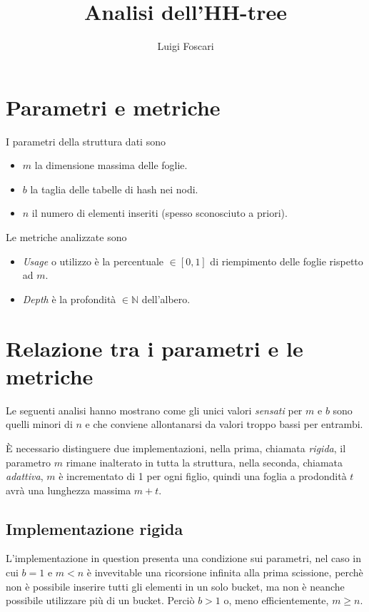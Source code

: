 \documentclass[a4paper]{article}
\title{Analisi dell'HH-tree}
\author{Luigi Foscari}
\date{}
\begin{document}
\maketitle

\section{Parametri e metriche}
I parametri della struttura dati sono
\begin{itemize}
	\item $m$ la dimensione massima delle foglie.
	\item $b$ la taglia delle tabelle di hash nei nodi.
	\item $n$ il numero di elementi inseriti (spesso sconosciuto a priori).
\end{itemize}
Le metriche analizzate sono
\begin{itemize}
	\item \textit{Usage} o utilizzo è la percentuale $\in [0, 1]$ di riempimento delle foglie rispetto ad $m$.
	\item \textit{Depth} è la profondità $\in \mathbb{N}$ dell'albero.
\end{itemize}

\section{Relazione tra i parametri e le metriche}

Le seguenti analisi hanno mostrano come gli unici valori \textit{sensati} per $m$ e $b$ sono quelli minori di $n$ e che conviene allontanarsi da valori troppo bassi per entrambi.

È necessario distinguere due implementazioni, nella prima, chiamata \textit{rigida}, il parametro $m$ rimane inalterato in tutta la struttura, nella seconda, chiamata \textit{adattiva}, $m$ è incrementato di 1 per ogni figlio, quindi una foglia a prodondità $t$ avrà una lunghezza massima $m + t$.


\subsection{Implementazione rigida}

L'implementazione in question presenta una condizione sui parametri, nel caso in cui $b = 1$ e $m < n$ è invevitable una ricorsione infinita alla prima scissione, perchè non è possibile inserire tutti gli elementi in un solo bucket, ma non è neanche possibile utilizzare più di un bucket. Perciò $b > 1$ o, meno efficientemente, $m \geq n$.
\end{document}
